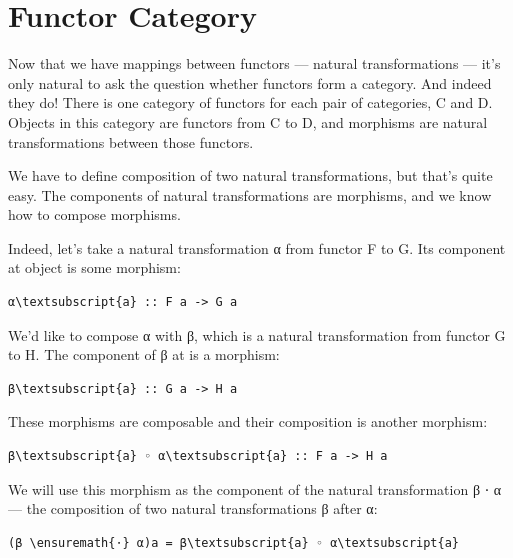 \section{Functor Category}\label{functor-category}

Now that we have mappings between functors --- natural transformations
--- it's only natural to ask the question whether functors form a
category. And indeed they do! There is one category of functors for each
pair of categories, C and D. Objects in this category are functors from
C to D, and morphisms are natural transformations between those
functors.

We have to define composition of two natural transformations, but that's
quite easy. The components of natural transformations are morphisms, and
we know how to compose morphisms.

Indeed, let's take a natural transformation α from functor F to G. Its
component at object  is some morphism:

\begin{Verbatim}[commandchars=\\\{\}]
α\textsubscript{a} :: F a -> G a
\end{Verbatim}
We'd like to compose α with β, which is a natural transformation from
functor G to H. The component of β at  is a morphism:

\begin{Verbatim}[commandchars=\\\{\}]
β\textsubscript{a} :: G a -> H a
\end{Verbatim}
These morphisms are composable and their composition is another
morphism:

\begin{Verbatim}[commandchars=\\\{\}]
β\textsubscript{a} ◦ α\textsubscript{a} :: F a -> H a
\end{Verbatim}
We will use this morphism as the component of the natural transformation
β ⋅ α --- the composition of two natural transformations β after α:

\begin{Verbatim}[commandchars=\\\{\}]
(β \ensuremath{⋅} α)a = β\textsubscript{a} ◦ α\textsubscript{a}
\end{Verbatim}

\begin{figure}[H]
\centering
{}
\end{figure}

